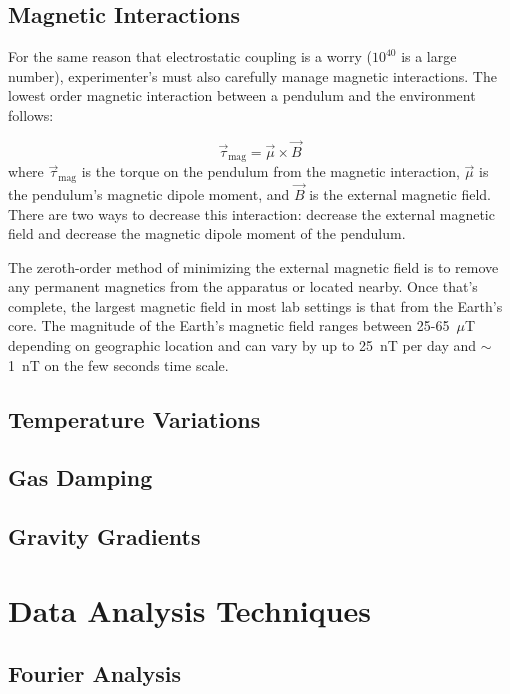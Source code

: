 \documentclass{book}
\begin{document}
\section{Magnetic Interactions}

\quad For the same reason that electrostatic coupling is a worry ($10^{40}$ is a large number), experimenter's must also carefully manage magnetic interactions. The lowest order magnetic interaction between a pendulum and the environment follows:

\begin{equation}
\vec{\tau}_{\text{mag}} =\vec{\mu} \times \vec{B}
\end{equation}
where $\vec{\tau}_{\text{mag}}$ is the torque on the pendulum from the magnetic interaction, $\vec{\mu}$ is the pendulum's magnetic dipole moment, and $\vec{B}$ is the external magnetic field. There are two ways to decrease this interaction: decrease the external magnetic field and decrease the magnetic dipole moment of the pendulum. 

The zeroth-order method of minimizing the external magnetic field is to remove any permanent magnetics from the apparatus or located nearby. Once that's complete, the largest magnetic field in most lab settings is that from the Earth's core. The magnitude of the Earth's magnetic field ranges between 25-65~$\mu$T depending on geographic location \cite{earthMag} and can vary by up to 25~nT per day and $\sim$1~nT on the few seconds time scale. \cite{earthMagVar} 

\section{Temperature Variations}
\section{Gas Damping} \label{gas}
\section{Gravity Gradients}\label{gravGrad}

\chapter{Data Analysis Techniques}
\section{Fourier Analysis}
\end{document}
